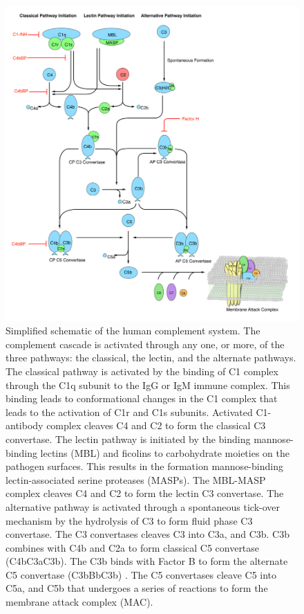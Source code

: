 \documentclass[12pt]{article}
\begin{document}
\begin{figure}[h]
\centering
\includegraphics[width=1.0\textwidth]{./figs/Fig1_Schematic_v2.pdf}
\caption{Simplified schematic of the human complement system. The complement cascade is activated through any one, or more, of the three pathways:  the classical, the lectin, and the alternate pathways. The classical pathway is activated by the binding of C1 complex through the C1q subunit to the IgG or IgM immune complex.  This binding leads to conformational changes in the C1 complex that leads to the activation of C1r and C1s subunits. Activated C1-antibody complex cleaves C4 and C2 to form the classical C3 convertase. The lectin pathway is initiated by the binding mannose-binding lectins (MBL) and ficolins to carbohydrate moieties on the pathogen surfaces. This results in the formation mannose-binding lectin-associated serine proteases (MASPs). The MBL-MASP complex cleaves C4 and C2 to form the lectin C3 convertase. The alternative pathway is activated through a spontaneous tick-over mechanism by the hydrolysis of C3 to form fluid phase C3 convertase. The C3 convertases  cleaves C3 into C3a, and C3b. C3b combines with C4b and C2a to form classical C5 convertase (C4bC3aC3b). The C3b binds with Factor B to form the alternate C5 convertase (C3bBbC3b) . The C5 convertases cleave C5 into C5a, and C5b that undergoes a series of reactions to form the membrane attack complex (MAC).}\label{fig-schematic}
\end{figure}
\end{document}
